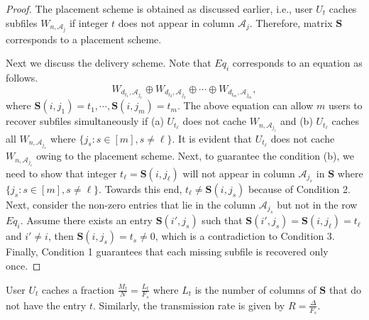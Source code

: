 \documentclass[journal,twocolumn]{IEEEtran}
\theoremstyle{definition}
\newcommand{\calA}{\mathcal{A}}
\newcommand{\calE}{\mathcal{E}}
\newcommand{\bfS}{\mathbf{S}}
\begin{document}
\begin{proof}
The placement scheme is obtained as discussed earlier, i.e., user $U_t$ caches subfiles $W_{n,\calA_j}$ if integer $t$ does not appear in column $\calA_j$. Therefore, matrix $\bfS$ corresponds to a placement scheme.

Next we discuss the delivery scheme. Note that $Eq_i$ corresponds to an equation as follows.
$$W_{d_{t_1},\calA_{j_1}} \oplus W_{d_{t_2},\calA_{j_2}} \oplus \cdots \oplus W_{d_{t_{m}},\calA_{j_{m}}},$$
where $\bfS(i,j_1)=t_1,\cdots, \bfS(i,j_{m})=t_{m}$. The above equation can allow $m$ users to recover subfiles simultaneously if (a) $U_{t_\ell}$ does not cache $W_{n,\calA_{j_\ell}}$ and (b) $U_{t_\ell}$ caches all $W_{n,\calA_{j_s}}$ where $\{j_s : s \in [m], s \neq \ell \}$. It is evident that $U_{t_\ell}$ does not cache $W_{n,\calA_{j_\ell}}$ owing to the placement scheme. Next, to guarantee the condition (b), we need to show that integer $t_\ell=\bfS(i,j_\ell)$ will not appear in column $\calA_{j_s}$ in $\bfS$ where $\{j_s : s \in [m], s \neq \ell\}$. Towards this end, $t_\ell \neq \bfS(i,j_s)$ because of Condition 2. Next, consider the non-zero entries that lie in the column $\calA_{j_s}$ but not in the row $Eq_i$. Assume there exists an entry $\bfS(i',j_s)$ such that $\bfS(i',j_s)=\bfS(i,j_\ell)=t_\ell$ and $i'\neq i$, then $\bfS(i,j_s)=t_s\neq 0$, which is a contradiction to Condition 3. Finally, Condition 1 guarantees that each missing subfile is recovered only once.
\end{proof}
User $U_t$ caches a fraction $\frac{M_t}{N}=\frac{L_t}{F_s}$ where $L_t$ is the number of columns of $\bfS$ that do not have the entry $t$. Similarly, the transmission rate is given by $R=\frac{\Delta}{F_s}$.




\end{document}
